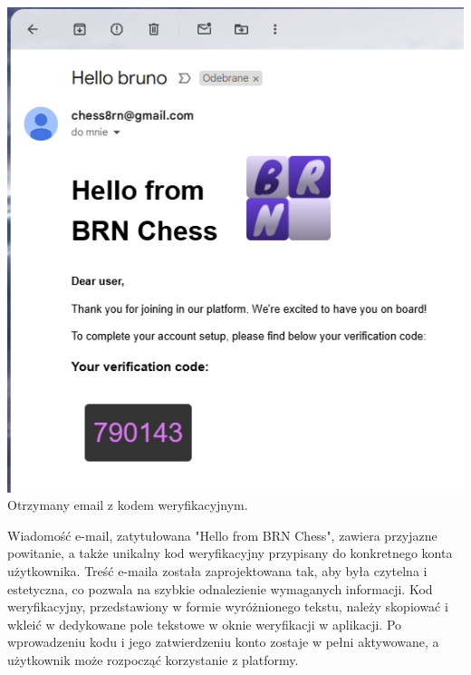 \documentclass[12pt,a4paper]{article}
\begin{document}
\vspace{1cm}

\begin{minipage}[t]{0.35\textwidth} 
    \vspace{0pt} 
    \centering 
    \includegraphics[width=\linewidth]{images/ins_min_mail.png} 
    Otrzymany email z kodem weryfikacyjnym.
\end{minipage} 
\hfill 
\begin{minipage}[t]{0.55\textwidth} 
    \vspace{0pt} 
    \raggedright 
    Wiadomość e-mail, zatytułowana "Hello from BRN Chess", zawiera przyjazne powitanie, a także unikalny kod weryfikacyjny przypisany do konkretnego konta użytkownika. Treść e-maila została zaprojektowana tak, aby była czytelna i estetyczna, co pozwala na szybkie odnalezienie wymaganych informacji. Kod weryfikacyjny, przedstawiony w formie wyróżnionego tekstu, należy skopiować i wkleić w dedykowane pole tekstowe w oknie weryfikacji w aplikacji. Po wprowadzeniu kodu i jego zatwierdzeniu konto zostaje w pełni aktywowane, a użytkownik może rozpocząć korzystanie z platformy. 
\end{minipage}

\vspace{1cm}
\end{document}
